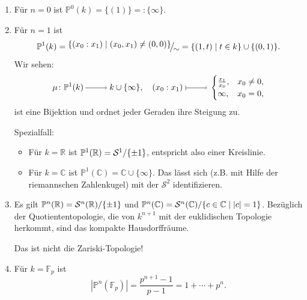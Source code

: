 \documentclass[a4paper,12pt]{scrbook}
\def\C{\mathbb{C}}
\def\P{\mathbb{P}}
\def\S{\mathcal{S}}
\newcommand{\FF}{\mathbb{F}}
\newcommand{\card}[1]{|#1|}
\newcommand{\set}[1]{\ensuremath{\mathbb{#1}}}
\newcommand{\R}{\set{R}}
\newcommand{\ra}{\raisebox{-1pt}{\tikz{\draw[thin,shorten >=3pt, ->] (0,0) node{\hspace*{-2pt}} -- node{} (1,0);}}\penalty1000\relax}
\renewcommand{\mapsto}{\raisebox{-1pt}{\tikz{\draw[thin,shorten >=3pt, |->] (0,0) node{\hspace*{0pt}} -- node{} (1,0);}}\penalty1000\relax}
\newcommand{\Quotient}[2]{
  \mathchoice
  { %
    \raisebox{0.7ex}{\ensuremath{#1}}
    \ensuremath{\mkern-3mu}\big/\ensuremath{\mkern-3mu}
    \raisebox{-0.6ex}{\ensuremath{#2}}
  }
  { %
    #1/#2
  }
  { %
    #1/#2
  }
  { %
    #1/#2
  }
}
\begin{document}
\begin{bsp}\label{2.2.2}\begin{enumerate}
\item Für $n=0$ ist $\P^{0}(k) = \{(1)\} =: \{\infty\}$.
\item Für $n=1$ ist \[\P^{1}(k)=\Quotient{\{(x_{0}:x_{1})\mid(x_{0},x_{1})\neq(0,0)\}}{\sim}=\{(1,t)\mid t\in k\}\cup\{(0,1)\}.\] \vspace*{-6pt}Wir sehen:\vspace*{-12pt}
\[\mu\colon\P^{1}(k)\ra k\cup\{\infty\},\quad(x_{0}:x_{1})\mapsto\begin{cases}\frac{x_{1}}{x_{0}},&x_{0}\neq0,\\\infty,&x_{0}=0,\\\end{cases}\]
ist eine Bijektion und ordnet jeder Geraden ihre Steigung zu.

{\sc Spezialfall:}\begin{itemize}\item Für $k=\R$ ist $\P^{1}(\R)=\Quotient{\S^{1}}{\{\pm1\}}$, entspricht also einer Kreislinie.
\item Für $k=\C$ ist $\P^{1}(\C)=\C\cup\{\infty\}$. Das lässt sich (z.B. mit Hilfe der riemannschen Zahlenkugel) mit der $\S^{2}$ identifizieren.
\end{itemize}
\item Es gilt $\P^{n}(\R)=\Quotient{\S^{n}(\R)}{\{\pm1\}}$ und $\P^{n}(\C)=\Quotient{\S^{n}(\C)}{\{c\in\C\mid |c|=1\}}$. Bezüglich der Quotiententopologie, die von $k^{n+1}$ mit der euklidischen Topologie herkommt, sind das kompakte Hausdorffräume.
\begin{w}Das ist nicht die Zariski-Topologie!\end{w}
\item Für $k=\FF_{p}$ ist
\[\card{\P^{n}(\FF_{p})}=\frac{p^{n+1}-1}{p-1}=1+\dotsm+p^{n}.\]
\end{enumerate}\end{bsp}
\end{document}
